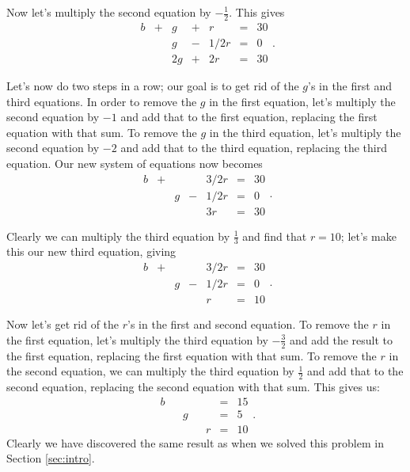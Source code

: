 Now let's multiply the second equation by $-\frac12$. This gives 
\[
\begin{array}{ccccccc}
b&+&g&+&r&=&30\\
 & & g&-&1/2r&=&0\\
 & &2g&+&2r&=&30
\end{array}.
\]


Let's now do two steps in a row; our goal is to get rid of the $g$'s in the first and third equations. In order to remove the $g$ in the first equation, let's multiply the second equation by $-1$ and add that to the first equation, replacing the first equation with that sum. To remove the $g$ in the third equation, let's multiply the second equation by $-2$ and add that to the third equation, replacing the third equation. Our new system of equations now becomes
\[
\begin{array}{ccccccc}
b&+& & &3/2r&=&30\\
 & &g&-&1/2r&=&0\\
 & & & &3r&=&30
\end{array}.
\]

Clearly we can multiply the third equation by $\frac13$ and find that $r=10$; let's make this our new third equation, giving
\[
\begin{array}{ccccccc}
b&+& & &3/2r&=&30\\
 & &g&-&1/2r&=&0\\
 & & & &r&=&10
\end{array}.
\]

Now let's get rid of the $r$'s in the first and second equation. To remove the $r$ in the first equation, let's multiply the third equation by $-\frac32$ and add the result to the first equation, replacing the first equation with that sum. To remove the $r$ in the second equation, we can multiply the third equation by $\frac12$ and add that to the second equation, replacing the second equation with that sum. This gives us:
\[
\begin{array}{ccccccc}
b& & & & &=&15\\
 & &g& & &=&5\\
 & & & &r&=&10
\end{array}.
\]
Clearly we have discovered the same result as when we solved this problem in Section \ref{sec:intro}. 

